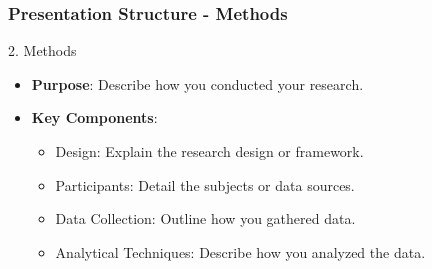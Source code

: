 \documentclass[aspectratio=169]{beamer}
\begin{document}
\begin{frame}[fragile]
    \frametitle{Presentation Structure - Methods}
    \begin{block}{2. Methods}
        \begin{itemize}
            \item \textbf{Purpose}: Describe how you conducted your research.
            \item \textbf{Key Components}:
            \begin{itemize}
                \item Design: Explain the research design or framework.
                \item Participants: Detail the subjects or data sources.
                \item Data Collection: Outline how you gathered data.
                \item Analytical Techniques: Describe how you analyzed the data.
            \end{itemize}
        \end{itemize}
    \end{block}
\end{frame}
\end{document}
